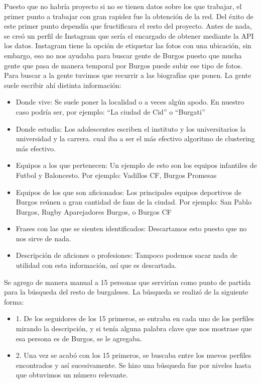 Puesto que no habría proyecto si no se tienen datos sobre los que trabajar, el primer punto a trabajar con gran rapidez fue la obtención de la red. Del éxito de este primer punto dependía que fructificara el resto del proyecto.
Antes de nada, se creó un perfil de Instagram que sería el encargado de obtener mediante la API los datos.
Instagram tiene la opción de etiquetar las fotos con una ubicación, sin embargo, eso no nos ayudaba para buscar gente de Burgos puesto que mucha gente que pasa de manera temporal por Burgos puede subir ese tipo de fotos.
Para buscar a la gente tuvimos que recurrir a las biografías que ponen. La gente suele escribir ahí distinta información:
\begin{itemize}
	\item Donde vive: Se suele poner la localidad o a veces algún apodo. En nuestro caso podría ser, por ejemplo: “La ciudad de Cid” o “Burgati”
	\item Donde estudia: Los adolescentes escriben el instituto y los universitarios la universidad y la carrera. cual iba a ser el más efectivo algoritmo de clustering más efectivo.
	\item Equipos a los que pertenecen: Un ejemplo de esto son los equipos infantiles de Futbol y Baloncesto. Por ejemplo: Vadillos CF, Burgos Promesas
	\item Equipos de los que son aficionados: Los principales equipos deportivos de Burgos reúnen a gran cantidad de fans de la ciudad. Por ejemplo: San Pablo Burgos, Rugby Aparejadores Burgos, o Burgos CF
	\item Frases con las que se sienten identificados: Descartamos esto puesto que no nos sirve de nada.
	\item Descripción de aficiones o profesiones: Tampoco podemos sacar nada de utilidad con esta información, así que es descartada.

\end{itemize}
Se agrego de manera manual a 15 personas que servirían como punto de partida para la búsqueda del resto de burgaleses.
La búsqueda se realizó de la siguiente forma:
\begin{itemize}
	\item 1. De los seguidores de los 15 primeros, se entraba en cada uno de los perfiles mirando la descripción, y si tenía alguna palabra clave que nos mostrase que esa persona es de Burgos, se le agregaba.
	\item 2. Una vez se acabó con los 15 primeros, se buscaba entre los nuevos perfiles encontrados y así sucesivamente. Se hizo una búsqueda fue por niveles hasta que obtuvimos un número relevante.

\end{itemize}
